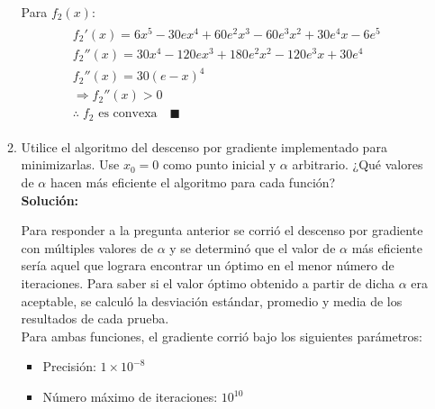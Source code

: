 \documentclass[10pt,letterpaper]{article}
\begin{document}
\begin{enumerate}
\begin{enumerate}
                    Para $f_2(x)$:
                    \begin{equation*} \begin{split} \begin{gathered}
                        f_2'(x) =  6 x^5  - 30 e x^4  + 60 e^2 x^3  - 60 e^3 x^2 + 30 e^4 x - 6 e^5  \\
                        f_2''(x) = 30 x^4 - 120 e x^3 + 180 e^2 x^2 - 120 e^3 x  + 30 e^4 \\
                        f_2''(x) = 30(e - x)^4 \\
                        \Rightarrow f_2''(x) > 0 \\
                        \therefore \; f_2 \text{ es convexa} \quad \blacksquare
                    \end{gathered} \end{split} \end{equation*}

                \item Utilice el algoritmo del descenso por gradiente implementado
                para minimizarlas. Use $x_0 = 0$ como punto inicial y $\alpha$
                arbitrario. ¿Qué valores de $\alpha$ hacen más eficiente el algoritmo
                para cada función? \\

                    \textbf{Solución:}

                    Para responder a la pregunta anterior se corrió el
                    descenso por gradiente con múltiples valores de $\alpha$
                    y se determinó que el valor de $\alpha$ más eficiente sería
                    aquel que lograra encontrar un óptimo en el menor número
                    de iteraciones. Para saber si el valor óptimo obtenido
                    a partir de dicha $\alpha$ era aceptable, se calculó la
                    desviación estándar, promedio y media de los resultados
                    de cada prueba. \\

                    Para ambas funciones, el gradiente corrió bajo los
                    siguientes parámetros:

                        \begin{itemize}
                            \item Precisión: $1 \times 10^{-8}$
                            \item Número máximo de iteraciones: $10^{10}$
                        \end{itemize}


\end{enumerate}
\end{enumerate}
\end{document}
